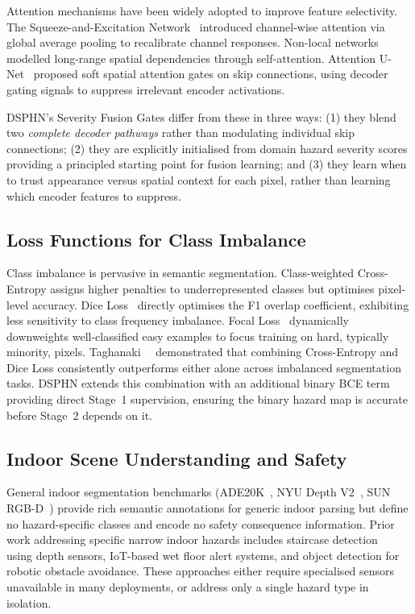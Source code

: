 Attention mechanisms have been widely adopted to improve feature
selectivity. The Squeeze-and-Excitation Network~\cite{hu2018squeeze}
introduced channel-wise attention via global average pooling to
recalibrate channel responses. Non-local networks~\cite{wang2018nonlocal}
modelled long-range spatial dependencies through self-attention.
Attention U-Net~\cite{oktay2018attention} proposed soft spatial
attention gates on skip connections, using decoder gating signals
to suppress irrelevant encoder activations.

DSPHN's Severity Fusion Gates differ from these in three ways:
(1) they blend two \textit{complete decoder pathways} rather than
modulating individual skip connections; (2) they are explicitly
initialised from domain hazard severity scores providing a
principled starting point for fusion learning; and (3) they learn
when to trust appearance versus spatial context for each pixel,
rather than learning which encoder features to suppress.

\subsection{Loss Functions for Class Imbalance}

Class imbalance is pervasive in semantic segmentation.
Class-weighted Cross-Entropy assigns higher penalties to
underrepresented classes but optimises pixel-level accuracy.
Dice Loss~\cite{milletari2016vnet} directly optimises the F1
overlap coefficient, exhibiting less sensitivity to class frequency
imbalance. Focal Loss~\cite{lin2017focal} dynamically downweights
well-classified easy examples to focus training on hard, typically
minority, pixels. Taghanaki~\etal~\cite{taghanaki2019combo}
demonstrated that combining Cross-Entropy and Dice Loss consistently
outperforms either alone across imbalanced segmentation tasks.
DSPHN extends this combination with an additional binary BCE term
providing direct Stage~1 supervision, ensuring the binary hazard
map is accurate before Stage~2 depends on it.

\subsection{Indoor Scene Understanding and Safety}

General indoor segmentation benchmarks (ADE20K~\cite{zhou2017scene},
NYU Depth V2~\cite{silberman2012indoor}, SUN RGB-D~\cite{song2015sun})
provide rich semantic annotations for generic indoor parsing but
define no hazard-specific classes and encode no safety consequence
information. Prior work addressing specific narrow indoor hazards
includes staircase detection~\cite{tummala2021stair} using depth
sensors, IoT-based wet floor alert systems, and object detection
for robotic obstacle avoidance. These approaches either require
specialised sensors unavailable in many deployments, or address
only a single hazard type in isolation.

